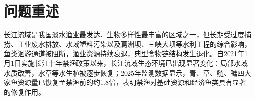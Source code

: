 \documentclass{MMCStyle}
\begin{document}
\begin{abstract}
长江十年禁渔实施后，四大家鱼资源量回升，长江江豚和长江鲟种群亦呈恢复态势，但资源枯竭、江湖连通性受阻、水体污染与外来物种入侵等问题仍较突出。本文围绕"资源恢复能否稳定转化为生态系统健康改善"核心问题，构建包含流域平均食物网、珍稀物种响应、Hastings-Powell三级食物链和综合情景评价的分层动力学模型，追踪禁渔生态收益在基础资源层、经济鱼类、珍稀物种与系统长期动力学行为间的传递过程。

对于问题一，我们在流域平均尺度下建立四类基础资源与四大家鱼功能群的配对动力系统，以2025年四大家鱼资源量恢复至禁渔前1.8倍的观测数据单参数标定，并以湖北江段单网次渔获量提升120\%作为局地验证。结果显示：2025年四大家鱼总生物量达禁渔前的1.805倍，单位捕捞努力量渔获量($\mathrm{CPUE}^*$)为1.838倍，摄食压力指数升至4.213，基础资源量末值降至0.204。禁渔初期恢复效应主要集中于消费者层，基础资源层生态压力同步加剧。

对于问题二，我们基于上游资源-鱼群动态轨迹构建综合生态状态指数，驱动中层猎物承载力，建立长江江豚、长江鲟及入侵物种种群响应模型，并设置高阻隔、无人工放流和污染三种对照情景。基线情景下，长江江豚与长江鲟种群末值分别为禁渔前的1.133倍和1.140倍；高阻隔情景下分别降至0.901倍和0.856倍；无人工放流时长江鲟降至0.519倍；污染情景下二者进一步降至0.610倍和0.704倍。结果显示，江湖通道阻隔会同时抑制两类珍稀物种恢复，而人工增殖放流对长江鲟的补偿效应更为显著。

对于问题三和问题四，我们采用统一的Hastings-Powell三级食物链模型，结合后期轨道统计量与有限时间最大李雅普诺夫指数判别系统长期动力学行为。随承载力参数$K$增大，系统由规则有界振荡逐渐转变为复杂非线性波动；在代表点$K=1.795$、$2.665$、$4.800$处，时间序列的峰谷差与峰间间隔离散程度均显著增大。短时间窗分析显示，首个连续正李雅普诺夫指数区间出现在$K=3.2186$附近，但75组扩展测试中仅5组在$K=3.20\sim3.22$区间出现指数由负转正。故本文仅保留"系统动力学复杂性随承载力提高而增强"的方向性结论。

对于问题五，我们在统一积分后期时间窗内提取饵料资源、长江江豚、长江鲟和入侵压力四类核心指标，采用熵权-CRITIC组合赋权构建综合生态健康评价模型。三种典型情景的综合得分依次为0.662、0.423和0.155，2000次局部参数扰动下情景排序稳定率达100\%。得分递减次序反映了"水体污染首先削弱禁渔收益，外来物种入侵进一步导致系统状态恶化"的作用机制。

综上，十年禁渔有利于长江渔业生态系统恢复，但资源恢复红利不会自动转化为系统整体健康改善。若不同步推进水质治理、江湖连通性修复、珍稀物种定向放流与入侵防控，禁渔成效仍可能在向高营养级传递及多重压力叠加过程中被逐步侵蚀。
\end{abstract}

\section{问题重述}
长江流域是我国淡水渔业最发达、生物多样性最丰富的区域之一，但长期受过度捕捞、工业废水排放、水域塑料污染以及葛洲坝、三峡大坝等水利工程的综合影响，鱼类洄游通道被阻断，渔业资源持续衰退，典型食物链结构发生退化。自2021年1月1日实施长江十年禁渔政策以来，长江流域生态环境已出现显著变化：局部水域水质改善，水草等水生植被逐步恢复；2025年监测数据显示，青、草、鲢、鳙四大家鱼资源量已恢复至禁渔前的约1.8倍，表明禁渔对基础资源和经济鱼类具有显著的修复作用。
\end{document}
